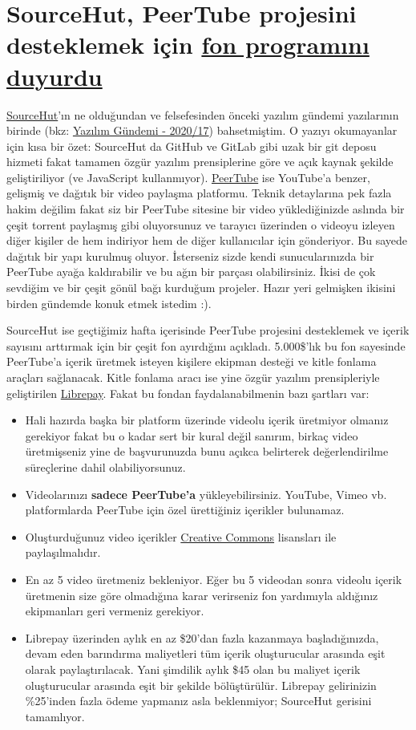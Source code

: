 \documentclass[11pt]{article}
\begin{document}
\section{SourceHut, PeerTube projesini desteklemek için \href{https://sourcehut.org/blog/2020-05-15-peertube-bootstrap-fund/}{fon programını duyurdu}}
\label{sec:org7775b05}
\href{https://sourcehut.org/}{SourceHut}'ın ne olduğundan ve felsefesinden önceki yazılım gündemi yazılarının
birinde (bkz: \href{../../2019/17/yazilim-gundemi-2020-17.pdf}{Yazılım Gündemi - 2020/17}) bahsetmiştim. O yazıyı okumayanlar
için kısa bir özet: SourceHut da GitHub ve GitLab gibi uzak bir git deposu
hizmeti fakat tamamen özgür yazılım prensiplerine göre ve açık kaynak şekilde
geliştiriliyor (ve JavaScript kullanmıyor). \href{https://joinpeertube.org/}{PeerTube} ise YouTube'a benzer,
gelişmiş ve dağıtık bir video paylaşma platformu. Teknik detaylarına pek fazla
hakim değilim fakat siz bir PeerTube sitesine bir video yüklediğinizde aslında
bir çeşit torrent paylaşmış gibi oluyorsunuz ve tarayıcı üzerinden o videoyu
izleyen diğer kişiler de hem indiriyor hem de diğer kullanıcılar için
gönderiyor. Bu sayede dağıtık bir yapı kurulmuş oluyor. İsterseniz sizde kendi
sunucularınızda bir PeerTube ayağa kaldırabilir ve bu ağın bir parçası
olabilirsiniz. İkisi de çok sevdiğim ve bir çeşit gönül bağı kurduğum
projeler. Hazır yeri gelmişken ikisini birden gündemde konuk etmek istedim :).

SourceHut ise geçtiğimiz hafta içerisinde PeerTube projesini desteklemek ve
içerik sayısını arttırmak için bir çeşit fon ayırdığını açıkladı. 5.000\$'lık
bu fon sayesinde PeerTube'a içerik üretmek isteyen kişilere ekipman desteği ve
kitle fonlama araçları sağlanacak. Kitle fonlama aracı ise yine özgür yazılım
prensipleriyle geliştirilen \href{https://liberapay.com/}{Librepay}. Fakat bu fondan faydalanabilmenin bazı
şartları var:
\begin{itemize}
\item Hali hazırda başka bir platform üzerinde videolu içerik üretmiyor olmanız
gerekiyor fakat bu o kadar sert bir kural değil sanırım, birkaç video
üretmişseniz yine de başvurunuzda bunu açıkca belirterek değerlendirilme
süreçlerine dahil olabiliyorsunuz.
\item Videolarınızı \textbf{sadece PeerTube'a} yükleyebilirsiniz. YouTube, Vimeo vb.
platformlarda PeerTube için özel ürettiğiniz içerikler bulunamaz.
\item Oluşturduğunuz video içerikler \href{https://creativecommons.org/}{Creative Commons} lisansları ile
paylaşılmalıdır.
\item En az 5 video üretmeniz bekleniyor. Eğer bu 5 videodan sonra videolu içerik
üretmenin size göre olmadığına karar verirseniz fon yardımıyla aldığınız
ekipmanları geri vermeniz gerekiyor.
\item Librepay üzerinden aylık en az \$20'dan fazla kazanmaya başladığınızda,
devam eden barındırma maliyetleri tüm içerik oluşturucular arasında eşit
olarak paylaştırılacak. Yani şimdilik aylık \$45 olan bu maliyet içerik
oluşturucular arasında eşit bir şekilde bölüştürülür. Librepay gelirinizin
\%25'inden fazla ödeme yapmanız asla beklenmiyor; SourceHut gerisini
tamamlıyor.
\end{itemize}
\end{document}
